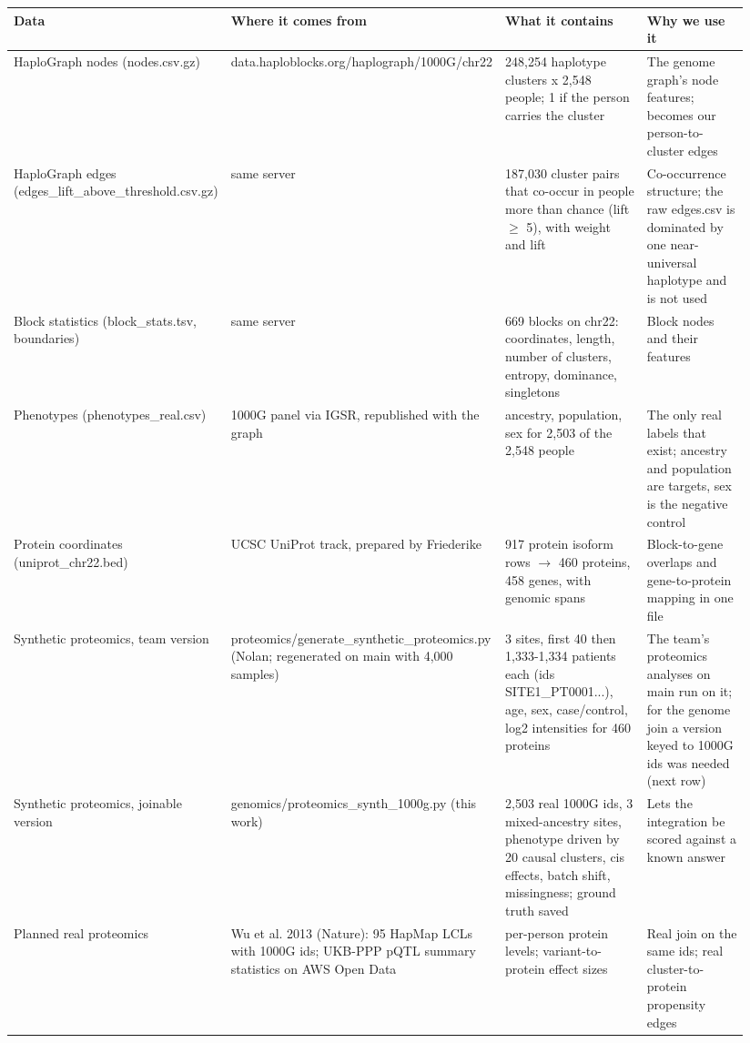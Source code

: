 \documentclass[11pt,a4paper]{article}
\begin{document}
\begin{longtable}{p{0.188\linewidth}p{0.207\linewidth}p{0.282\linewidth}p{0.263\linewidth}}
\toprule
\textbf{Data} & \textbf{Where it comes from} & \textbf{What it contains} & \textbf{Why we use it} \\
\midrule
\endhead
HaploGraph nodes (nodes.csv.gz) & data.haploblocks.org/haplograph/1000G/chr22 & 248,254 haplotype clusters x 2,548 people; 1 if the person carries the cluster & The genome graph's node features; becomes our person-to-cluster edges \\
HaploGraph edges (edges\_lift\_above\_threshold.csv.gz) & same server & 187,030 cluster pairs that co-occur in people more than chance (lift $\geq$ 5), with weight and lift & Co-occurrence structure; the raw edges.csv is dominated by one near-universal haplotype and is not used \\
Block statistics (block\_stats.tsv, boundaries) & same server & 669 blocks on chr22: coordinates, length, number of clusters, entropy, dominance, singletons & Block nodes and their features \\
Phenotypes (phenotypes\_real.csv) & 1000G panel via IGSR, republished with the graph & ancestry, population, sex for 2,503 of the 2,548 people & The only real labels that exist; ancestry and population are targets, sex is the negative control \\
Protein coordinates (uniprot\_chr22.bed) & UCSC UniProt track, prepared by Friederike & 917 protein isoform rows $\rightarrow$ 460 proteins, 458 genes, with genomic spans & Block-to-gene overlaps and gene-to-protein mapping in one file \\
Synthetic proteomics, team version & proteomics/generate\_synthetic\_proteomics.py (Nolan; regenerated on main with 4,000 samples) & 3 sites, first 40 then 1,333-1,334 patients each (ids SITE1\_PT0001...), age, sex, case/control, log2 intensities for 460 proteins & The team's proteomics analyses on main run on it; for the genome join a version keyed to 1000G ids was needed (next row) \\
Synthetic proteomics, joinable version & genomics/proteomics\_synth\_1000g.py (this work) & 2,503 real 1000G ids, 3 mixed-ancestry sites, phenotype driven by 20 causal clusters, cis effects, batch shift, missingness; ground truth saved & Lets the integration be scored against a known answer \\
Planned real proteomics & Wu et al. 2013 (Nature): 95 HapMap LCLs with 1000G ids; UKB-PPP pQTL summary statistics on AWS Open Data & per-person protein levels; variant-to-protein effect sizes & Real join on the same ids; real cluster-to-protein propensity edges \\
\bottomrule
\end{longtable}
\end{document}

